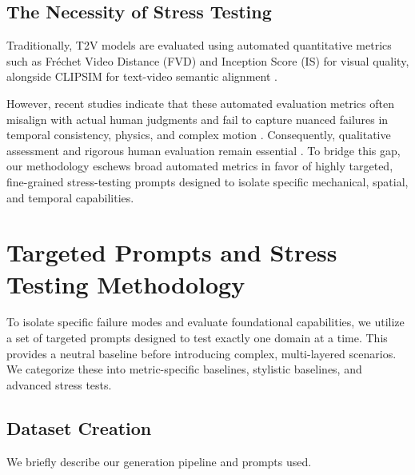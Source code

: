 \documentclass[sigconf]{acmart}
\begin{document}
\subsection{The Necessity of Stress Testing}
Traditionally, T2V models are evaluated using automated quantitative metrics such as Fréchet Video Distance (FVD) and Inception Score (IS) for visual quality, alongside CLIPSIM for text-video semantic alignment \cite{xie2025comprehensive}.

However, recent studies indicate that these automated evaluation metrics often misalign with actual human judgments and fail to capture nuanced failures in temporal consistency, physics, and complex motion \cite{xie2025comprehensive}. Consequently, qualitative assessment and rigorous human evaluation remain essential \cite{xie2025comprehensive}. To bridge this gap, our methodology eschews broad automated metrics in favor of highly targeted, fine-grained stress-testing prompts designed to isolate specific mechanical, spatial, and temporal capabilities.

\section{Targeted Prompts and Stress Testing Methodology} \label{sec:targeted_and_stress_testing}
To isolate specific failure modes and evaluate foundational capabilities, we utilize a set of targeted prompts designed to test exactly one domain at a time.
This provides a neutral baseline before introducing complex, multi-layered scenarios. We categorize these into metric-specific baselines, stylistic baselines, and advanced stress tests.

\subsection{Dataset Creation}

We briefly describe our generation pipeline and prompts used.
\end{document}
